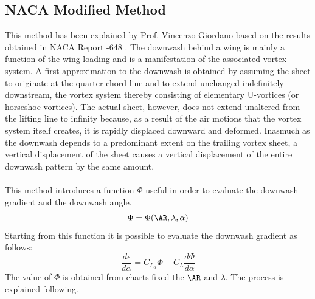 \subsection {NACA Modified Method }
This method has been explained by Prof. Vincenzo Giordano\cite{uninagiordano}  based on the results obtained in NACA Report -648 \cite{Jacobs:NACA:Rep:648}.
The downwash behind a wing is mainly a function of the wing loading and is a manifestation of the associated vortex system. A first approximation to the downwash is obtained by assuming the sheet to originate at the quarter-chord line and to extend unchanged indefinitely downstream, the vortex system thereby consisting of elementary U-vortices (or horseshoe vorticcs). The actual sheet, however, does not extend unaltered from the lifting line to infinity because, as a result of the air motions that the vortex system itself creates, it is rapidly displaced downward and deformed. Inasmuch as the downwash depends to a predominant extent on the trailing vortex sheet, a vertical displacement of the sheet causes a vertical displacement of the entire downwash pattern by the same amount. \\ \\
This method introduces a function $\Phi$ useful in order to evaluate the downwash gradient and the downwash angle.
\begin{equation}
\Phi = \Phi ( \AR , \lambda, \alpha)
\end{equation}
Starting from this function it is possible to evaluate the downwash gradient as follows:
\begin{equation}
\frac{d\epsilon}{d \alpha } = C_{L_{\alpha}} \Phi + C_L \frac{d\Phi}{d \alpha }
\end{equation}
The value of $\Phi$ is obtained from charts fixed the $\AR$ and $\lambda$. The process is explained following.
\noindent \\

